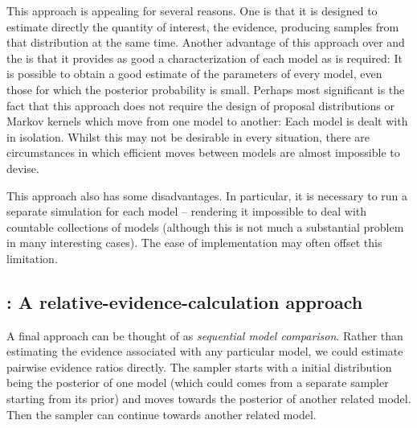 
This approach is appealing for several reasons. One is that it is designed to estimate directly the quantity of interest, the evidence, producing samples from that distribution at the same time. Another advantage of this approach over \smc[1] and the \rjmcmc is that it provides as good a characterization of each model as is required: It is possible to obtain a good estimate of the parameters of every model, even those for which the posterior probability is small. Perhaps most significant is the fact that this approach does not require the design of proposal distributions or Markov kernels which move from one model to another: Each model is dealt with in isolation. Whilst this may not be desirable in every situation, there are circumstances in which efficient moves between models are almost impossible to devise.

This approach also has some disadvantages. In particular, it is necessary to run a separate simulation for each model -- rendering it impossible to deal with countable collections of models (although this is not much a substantial problem in many interesting cases). The ease of implementation may often offset this limitation.

\subsection[SMC3: A relative-evidence-calculation approach]
{\smc[3]: A relative-evidence-calculation approach}
\label{sub:smc3: A relative-evidence-calculation approach}

A final approach can be thought of as \emph{sequential model comparison}. Rather than estimating the evidence associated with any particular model, we could estimate pairwise evidence ratios directly. The \smc sampler starts with a initial distribution being the posterior of one model (which could comes from a separate \smc sampler starting from its prior) and moves towards the posterior of another related model. Then the sampler can continue towards another related model.

